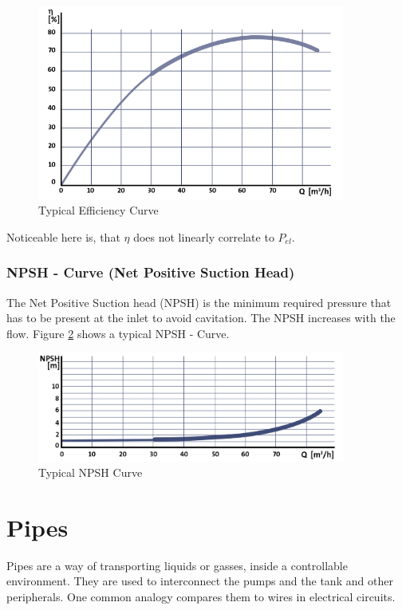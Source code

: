 \begin{figure}[h]
	\centering
	\includegraphics[width=0.9\textwidth]{figures/03physicalSetup/typicalEfficiencyCurve.PNG}
	\caption{Typical Efficiency Curve}
	\label{fig:typicalEfficiencyCurve}
\end{figure}
Noticeable here is,
that $\eta$ does not linearly correlate to $P_{el}$.

\subsubsection{NPSH - Curve (Net Positive Suction Head)}
The Net Positive Suction head (NPSH) is the minimum required pressure that has to be present at the inlet to avoid cavitation.
The NPSH increases with the flow.
Figure \ref{fig:typicalNPSHCurve} shows a typical NPSH - Curve.

\begin{figure}[h]
	\centering
	\includegraphics[width=0.9\textwidth]{figures/03physicalSetup/typicalNPSHCurve.PNG}
	\caption{Typical NPSH Curve}
	\label{fig:typicalNPSHCurve}
\end{figure}

\section{Pipes}
Pipes are a way of transporting liquids or gasses, inside a controllable environment.
They are used to interconnect the pumps and the tank and other peripherals.
One common analogy compares them to wires in electrical circuits.

